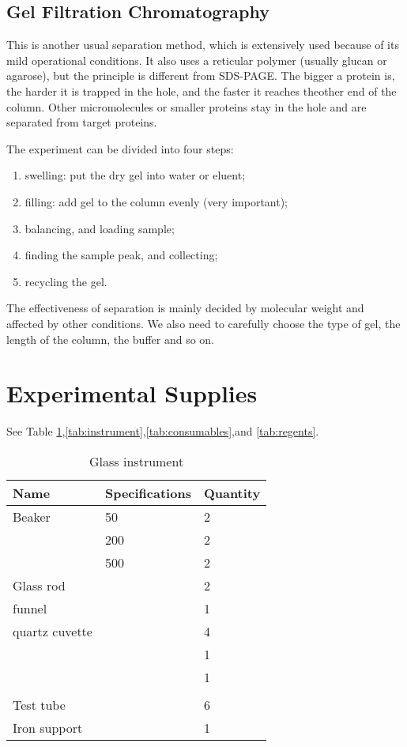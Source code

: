 \subsection{Gel Filtration Chromatography}

This is another usual separation method, which is extensively used because of its mild operational conditions. It also uses a reticular polymer (usually glucan or agarose), but the principle is different from SDS-PAGE. The bigger a protein is, the harder it is trapped in the hole, and the faster it reaches theother end of the column. Other micromolecules or smaller proteins stay in the hole and are separated from target proteins. 

The experiment can be divided into four steps:
\begin{enumerate}
\item swelling: put the dry gel into water or eluent;
\item filling: add gel to the column evenly (very important);
\item balancing, and loading sample;
\item finding the sample peak, and collecting;
\item recycling the gel.
\end{enumerate}

The effectiveness of separation is mainly decided by molecular weight and affected by other conditions. We also need to carefully choose the type of gel, the length of the column, the buffer and so on. 

\section{Experimental Supplies}
See Table \ref{tab:glass},\ref{tab:instrument},\ref{tab:consumables},and \ref{tab:regents}.

\begin{table}[!h]
	\centering
	\caption{Glass instrument}
    \begin{tabular}{lll}
    	\toprule
    	Name  & Specifications & Quantity \\
    	\midrule
    	Beaker & 50    & 2 \\
    	& 200   & 2 \\
    	& 500   & 2 \\
    	Glass rod &       & 2 \\
    	funnel &       & 1 \\
    	quartz cuvette &       & 4 \\
    	&       & 1 \\
    	&       & 1 \\
    	&       &  \\
    	Test tube &       & 6 \\
    	Iron support &       & 1 \\
    	\bottomrule
    \end{tabular}%
	\label{tab:glass}%
\end{table}%

